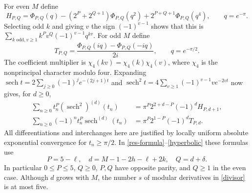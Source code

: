 \documentclass[11pt]{article}
\newcommand{\sech}{\operatorname{sech}}
\begin{document}
For even $M$ define
\begin{equation}\label{H}
 H_{P,Q}=\Phi_{P,Q}(q)
  -(2^P+2^{Q+1})\Phi_{P,Q}(q^2)
  +2^{P+Q+1}\Phi_{P,Q}(q^4),\qquad q=e^{-\pi}.
\end{equation}
Selecting odd $k$ and giving $v$ the sign $(-1)^{v-1}$ shows that
this is $\sum_{k\text{ odd},v\ge1}k^Pv^Q(-1)^{v-1}q^{kv}$.
For odd $M$ define
\begin{equation}\label{T}
 T_{P,Q}=\frac{\Phi_{P,Q}(iq)-\Phi_{P,Q}(-iq)}{2i},
       \qquad q=e^{-\pi/2}.
\end{equation}
The coefficient multiplier is $\chi_4(kv)=\chi_4(k)\chi_4(v)$,
where $\chi_4$ is the nonprincipal character modulo four.
Expanding $\sech t=2\sum_{j\ge0}(-1)^je^{-(2j+1)t}$ and
$\sech^2t=4\sum_{v\ge1}(-1)^{v-1}ve^{-2vt}$ now gives, for $d\ge0$,
\begin{align}
 \sum_{n\ge0}t_n^P(\sech^2)^{(d)}(t_n)
    &=\pi^P2^{2+d-P}(-1)^d H_{P,d+1},\label{even-sum}\\
 \sum_{n\ge0}(-1)^nt_n^P\sech^{(d)}(t_n)
    &=\pi^P2^{1-P}(-1)^d T_{P,d}.\label{odd-sum}
\end{align}
All differentiations and interchanges here are justified by locally
uniform absolute exponential convergence for $t_n\ge\pi/2$.
In \eqref{res-formula}--\eqref{hyperbolic} these formulas use
\begin{equation}\label{indices}
 P=5-\ell,\quad d=M-1-2h-\ell+2k,\quad Q=d+\delta.
\end{equation}
In particular $0\le P\le5$, $Q\ge0$, $P,Q$ have opposite parity,
and $Q\ge1$ in the even case. Although $d$ grows with $M$, the
number $s$ of modular derivatives in \eqref{divisor} is at most five.
\end{document}
